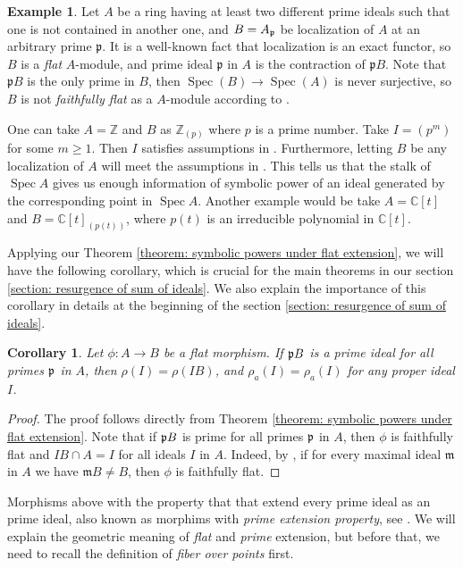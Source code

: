 \documentclass[12pt]{amsart}
\numberwithin{equation}{section}
\newtheorem{corollary}[theorem]{Corollary}
\theoremstyle{definition}
\newtheorem{example}[theorem]{Example}
\DeclareMathOperator{\Spec}{Spec}
\newcommand{\CC}{{\mathbb C}}
\newcommand{\ZZ}{{\mathbb Z}}
\def\pp{{\frak p}}
\begin{document}
 
\begin{example}\label{example: flat not faithfully flat 2}
  Let $A$ be a ring having at least two different prime ideals such that one is not contained in another one, and $B=A_\pp$ be localization of $A$ at an arbitrary prime $\mathfrak{p}$. It is a well-known fact that localization is an exact functor, so $B$ is a \emph{flat} $A$-module, and prime ideal $\mathfrak{p}$ in $A$ is the contraction of $\mathfrak{p}B$. Note that $\mathfrak{p}B$ is the only prime in $B$, then $\Spec(B) \rightarrow \Spec(A)$ is never surjective, so $B$ is not \emph{faithfully flat} as a $A$-module according to \cite[ex 3.16]{atiyah1994introduction}. 
\par 

One can take $A=\ZZ$ and $B$ as $\mathbb{Z}_{(p)}$ where $p$ is a prime number. Take  $I=(p^m)$ for some $m\geqslant 1$. Then $I$ satisfies assumptions in  . Furthermore, letting $B$ be any localization of $A$ will meet the assumptions in . This tells us that the stalk of $\Spec A$ gives us enough information of symbolic power of an ideal generated by the corresponding point in $\Spec A$. 
Another example would be take $A=\CC[t]$ and $B=\CC[t]_{(p(t))}$, where $p(t)$ is an irreducible polynomial in $\CC[t]$. 
	\end{example}	
	
	Applying our Theorem \ref{theorem: symbolic powers under flat extension}, we will have the following corollary, which is crucial for the main theorems in our section \ref{section: resurgence of sum of ideals}. We also explain the importance of this corollary in details at the beginning of the section \ref{section: resurgence of sum of ideals}.

 \begin{corollary}\label{corollary: resurgence via prime extension}
Let $\phi: A \to B$ be a flat morphism. If $\pp B$ is a prime ideal for all primes $\pp$ in $A$, then $\rho(I)=\rho(IB)$, and $\rho_a(I)=\rho_a(I)$ for any proper ideal $I$. 
 \end{corollary}
 \begin{proof}
The proof follows directly from Theorem \ref{theorem: symbolic powers under flat extension}. Note that if $\pp B$ is prime for all primes $\pp$ in $A$, then $\phi$ is faithfully flat and $IB\cap A=I$ for all ideals $I$ in $A$.  Indeed, by  \cite[theorem 7.2]{matsumura1989commutative}, if for every maximal ideal $\mathfrak{m}$ in $A$ we have $\mathfrak{m}B \neq B$, then $\phi$ is faithfully flat. 
\end{proof}
Morphisms above with the property that that extend every prime ideal as an prime ideal, also known as morphims with \emph{prime extension property}, see \cite{hochsterprime}. We will explain the geometric meaning of \emph{flat} and \emph{prime} extension, but before that, we need to recall the definition of \emph{fiber over points} first.
\end{document}
